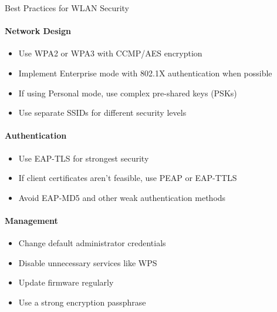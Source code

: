\begin{KR}{Best Practices for WLAN Security}\\
\paragraph{Network Design}
\begin{itemize}
    \item Use WPA2 or WPA3 with CCMP/AES encryption
    \item Implement Enterprise mode with 802.1X authentication when possible
    \item If using Personal mode, use complex pre-shared keys (PSKs)
    \item Use separate SSIDs for different security levels
\end{itemize}

\paragraph{Authentication}
\begin{itemize}
    \item Use EAP-TLS for strongest security
    \item If client certificates aren't feasible, use PEAP or EAP-TTLS
    \item Avoid EAP-MD5 and other weak authentication methods
\end{itemize}

\paragraph{Management}
\begin{itemize}
    \item Change default administrator credentials
    \item Disable unnecessary services like WPS
    \item Update firmware regularly
    \item Use a strong encryption passphrase
\end{itemize}
\end{KR}


